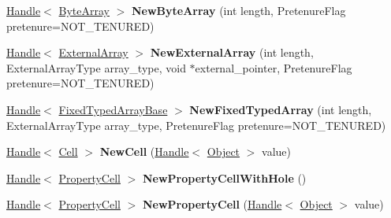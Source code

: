 \begin{DoxyCompactItemize}
\item 
\hypertarget{classv8_1_1internal_1_1_v8___f_i_n_a_l_a3050648332841b1a72774b5816924a11}{}\hyperlink{classv8_1_1internal_1_1_handle}{Handle}$<$ \hyperlink{classv8_1_1internal_1_1_byte_array}{Byte\+Array} $>$ {\bfseries New\+Byte\+Array} (int length, Pretenure\+Flag pretenure=N\+O\+T\+\_\+\+T\+E\+N\+U\+R\+E\+D)\label{classv8_1_1internal_1_1_v8___f_i_n_a_l_a3050648332841b1a72774b5816924a11}

\item 
\hypertarget{classv8_1_1internal_1_1_v8___f_i_n_a_l_ace6837063bdc5f1810800eb147b4cf9a}{}\hyperlink{classv8_1_1internal_1_1_handle}{Handle}$<$ \hyperlink{classv8_1_1internal_1_1_external_array}{External\+Array} $>$ {\bfseries New\+External\+Array} (int length, External\+Array\+Type array\+\_\+type, void $\ast$external\+\_\+pointer, Pretenure\+Flag pretenure=N\+O\+T\+\_\+\+T\+E\+N\+U\+R\+E\+D)\label{classv8_1_1internal_1_1_v8___f_i_n_a_l_ace6837063bdc5f1810800eb147b4cf9a}

\item 
\hypertarget{classv8_1_1internal_1_1_v8___f_i_n_a_l_a95cb8d7fb6764584ecbb75a3e7ea1536}{}\hyperlink{classv8_1_1internal_1_1_handle}{Handle}$<$ \hyperlink{classv8_1_1internal_1_1_fixed_typed_array_base}{Fixed\+Typed\+Array\+Base} $>$ {\bfseries New\+Fixed\+Typed\+Array} (int length, External\+Array\+Type array\+\_\+type, Pretenure\+Flag pretenure=N\+O\+T\+\_\+\+T\+E\+N\+U\+R\+E\+D)\label{classv8_1_1internal_1_1_v8___f_i_n_a_l_a95cb8d7fb6764584ecbb75a3e7ea1536}

\item 
\hypertarget{classv8_1_1internal_1_1_v8___f_i_n_a_l_a80e97e69df1f219cce250aca1425d53a}{}\hyperlink{classv8_1_1internal_1_1_handle}{Handle}$<$ \hyperlink{classv8_1_1internal_1_1_cell}{Cell} $>$ {\bfseries New\+Cell} (\hyperlink{classv8_1_1internal_1_1_handle}{Handle}$<$ \hyperlink{classv8_1_1internal_1_1_object}{Object} $>$ value)\label{classv8_1_1internal_1_1_v8___f_i_n_a_l_a80e97e69df1f219cce250aca1425d53a}

\item 
\hypertarget{classv8_1_1internal_1_1_v8___f_i_n_a_l_af84eebd9e6f096c24b40cf4d6abf80d6}{}\hyperlink{classv8_1_1internal_1_1_handle}{Handle}$<$ \hyperlink{classv8_1_1internal_1_1_property_cell}{Property\+Cell} $>$ {\bfseries New\+Property\+Cell\+With\+Hole} ()\label{classv8_1_1internal_1_1_v8___f_i_n_a_l_af84eebd9e6f096c24b40cf4d6abf80d6}

\item 
\hypertarget{classv8_1_1internal_1_1_v8___f_i_n_a_l_aa5142c22092b93bb02a84be52e931471}{}\hyperlink{classv8_1_1internal_1_1_handle}{Handle}$<$ \hyperlink{classv8_1_1internal_1_1_property_cell}{Property\+Cell} $>$ {\bfseries New\+Property\+Cell} (\hyperlink{classv8_1_1internal_1_1_handle}{Handle}$<$ \hyperlink{classv8_1_1internal_1_1_object}{Object} $>$ value)\label{classv8_1_1internal_1_1_v8___f_i_n_a_l_aa5142c22092b93bb02a84be52e931471}


\end{DoxyCompactItemize}
